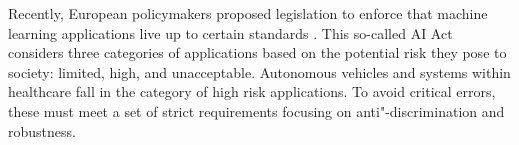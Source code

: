 Recently, European policymakers proposed legislation to enforce that machine learning applications live up to certain standards \parencite{europeancommission_briefing_2021}. 
This so-called AI Act considers three categories of applications based on the potential risk they pose to society: limited, high, and unacceptable. 
Autonomous vehicles and systems within healthcare fall in the category of high risk applications. To avoid critical errors, these must meet a set of strict requirements focusing on anti"-discrimination and robustness.


